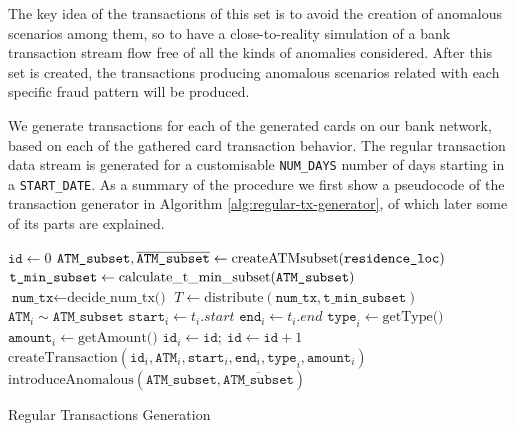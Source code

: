 The key idea of the transactions of this set is to avoid the creation of anomalous scenarios among them, so to have a close-to-reality simulation of a bank transaction stream flow free of all the kinds of anomalies considered. After this set is created, the transactions producing anomalous scenarios related with each specific fraud pattern will be produced.

We generate transactions for each of the generated cards on our bank network, based on each of the gathered card transaction behavior. The regular transaction data stream is generated for a customisable \texttt{NUM\_DAYS} number of days starting in a \texttt{START\_DATE}. As a summary of the procedure we first show a pseudocode of the transaction generator in Algorithm \ref{alg:regular-tx-generator}, of which later some of its parts are explained.

\begin{algorithm}[H]
  \small
  \begin{algorithmic}[1]
  \STATE $\texttt{id} \gets 0$
    \STATE $\texttt{ATM\_subset}, \overline{\texttt{ATM\_subset}} \gets \text{createATMsubset(\texttt{residence\_loc})}$
    \STATE $\texttt{t\_min\_subset} \gets \text{calculate\_t\_min\_subset(\texttt{ATM\_subset})}$
    \STATE $\texttt{num\_tx} \gets \text{decide\_num\_tx()}$
    \STATE $T \gets \text{distribute}(\texttt{num\_tx}, \texttt{t\_min\_subset})$
        \STATE $\texttt{ATM}_{i} \sim \texttt{ATM\_subset}$
        \STATE $\texttt{start}_{i} \gets t_i.start$
        \STATE $\texttt{end}_{i} \gets t_i.end$
        \STATE $\texttt{type}_{i} \gets \text{getType()}$
        \STATE $\texttt{amount}_{i} \gets \text{getAmount()}$
        \STATE $\texttt{id}_{i} \gets \texttt{id}; \ \texttt{id} \gets \texttt{id} + 1$
        \STATE $\text{createTransaction}(\texttt{id}_{i}, \texttt{ATM}_i, \texttt{start}_{i},\texttt{end}_{i}, \texttt{type}_{i}, \texttt{amount}_i)$
    \ENDFOR
    \STATE $\text{introduceAnomalous}(\texttt{ATM\_subset}, \overline{\texttt{ATM\_subset}})$
  \ENDFOR
  \end{algorithmic}
  \caption{Regular Transactions Generation}
  \label{alg:regular-tx-generator}
\end{algorithm}

